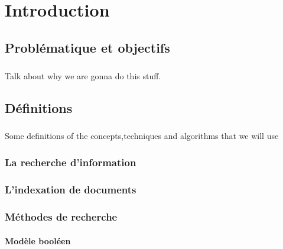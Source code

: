 \documentclass[12pt]{report}
\begin{document}
 
\tableofcontents
\listoffigures
\listoftables


\newpage




\chapter{Introduction}
	\section{Problématique et objectifs}
	\paragraph{}
	Talk about why we are gonna do this stuff.
	
	\section{Définitions}
	\paragraph{}
	Some definitions of the concepts,techniques and algorithms that we will use
		\subsection{La recherche d'information}
		\paragraph{}
		
		\subsection{L'indexation de documents}
		\paragraph{}
		
		\subsection{Méthodes de recherche}
			\subsubsection{Modèle booléen}
\end{document}
